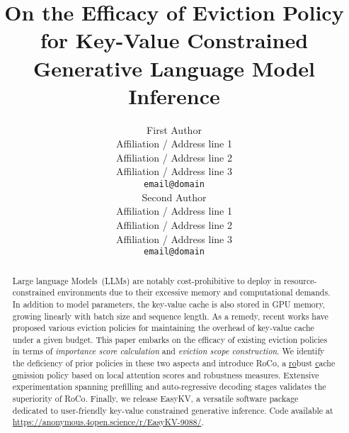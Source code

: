 \documentclass[11pt]{article}
\title{On the Efficacy of Eviction Policy for Key-Value Constrained Generative Language Model Inference}
\author{First Author \\
  Affiliation / Address line 1 \\
  Affiliation / Address line 2 \\
  Affiliation / Address line 3 \\
  \texttt{email@domain} \\\And
  Second Author \\
  Affiliation / Address line 1 \\
  Affiliation / Address line 2 \\
  Affiliation / Address line 3 \\
  \texttt{email@domain} \\}
\begin{document}
\maketitle
\begin{abstract}
  Large language Models~(LLMs) are notably cost-prohibitive to deploy in resource-constrained environments due to their excessive memory and computational demands. In addition to model parameters, the key-value cache is also stored in GPU memory, growing linearly with batch size and sequence length. As a remedy, recent works have proposed various eviction policies for maintaining the overhead of key-value cache under a given budget. 
 This paper embarks on the efficacy of existing eviction policies in terms of \textit{importance score calculation} and \textit{eviction scope construction}. We identify the deficiency of prior policies in these two aspects and introduce RoCo, a \underline{r}\underline{o}bust \underline{c}ache \underline{o}mission policy based on local attention scores and robustness measures. Extensive experimentation spanning prefilling and auto-regressive decoding stages validates the superiority of RoCo. Finally, we release EasyKV, a versatile software package dedicated to user-friendly key-value constrained generative inference. Code available at \url{https://anonymous.4open.science/r/EasyKV-9088/}.
\end{abstract}









\clearpage
\newpage
\appendix

\end{document}
